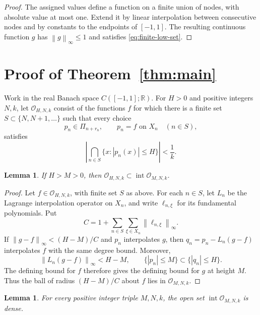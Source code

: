 \documentclass[11pt]{article}
\newtheorem{lemma}[theorem]{Lemma}
\theoremstyle{definition}
\numberwithin{equation}{section}
\newcommand{\R}{\mathbb R}
\newcommand{\norm}[1]{\left\lVert #1\right\rVert}
\begin{document}
\begin{proof}
The assigned values define a function on a finite union of nodes,
with absolute value at most one. Extend it by linear interpolation
between consecutive nodes and by constants to the endpoints of
\([-1,1]\). The resulting continuous function \(g\) has
\(\norm{g}_\infty\le1\) and satisfies \eqref{eq:finite-low-set}.
\end{proof}

\section{Proof of Theorem~\ref{thm:main}}\label{sec:baire}

Work in the real Banach space \(C([-1,1];\R)\).
For \(H>0\) and positive integers \(N,k\), let \(\mathcal O_{H,N,k}\)
consist of the functions \(f\) for which there is a finite set
\(S\subset\{N,N+1,\ldots\}\) such that every choice
\[
 p_n\in\Pi_{n+r_n},\qquad p_n=f\text{ on }X_n\quad(n\in S),
\]
satisfies
\[
 \left|\bigcap_{n\in S}\{x:|p_n(x)|\le H\}\right|<\frac1k.
\]

\begin{lemma}\label{lem:stability}
If \(H>M>0\), then
\(\mathcal O_{H,N,k}\subset\operatorname{int}\mathcal O_{M,N,k}\).
\end{lemma}

\begin{proof}
Let \(f\in\mathcal O_{H,N,k}\), with finite set \(S\) as above.
For each \(n\in S\), let \(L_n\) be the Lagrange interpolation
operator on \(X_n\), and write \(\ell_{n,\xi}\) for its fundamental
polynomials. Put
\[
 C=1+\sum_{n\in S}\sum_{\xi\in X_n}\norm{\ell_{n,\xi}}_\infty.
\]
If \(\norm{g-f}_\infty<(H-M)/C\) and \(p_n\) interpolates \(g\),
then \(q_n=p_n-L_n(g-f)\) interpolates \(f\) with the same degree
bound. Moreover,
\[
 \norm{L_n(g-f)}_\infty<H-M,
 \qquad
 \{|p_n|\le M\}\subset\{|q_n|\le H\}.
\]
The defining bound for \(f\) therefore gives the defining bound for
\(g\) at height \(M\). Thus the ball of radius \((H-M)/C\) about
\(f\) lies in \(\mathcal O_{M,N,k}\).
\end{proof}

\begin{lemma}\label{lem:dense-open}
For every positive integer triple \(M,N,k\), the open set
\(\operatorname{int}\mathcal O_{M,N,k}\) is dense.
\end{lemma}
\end{document}
